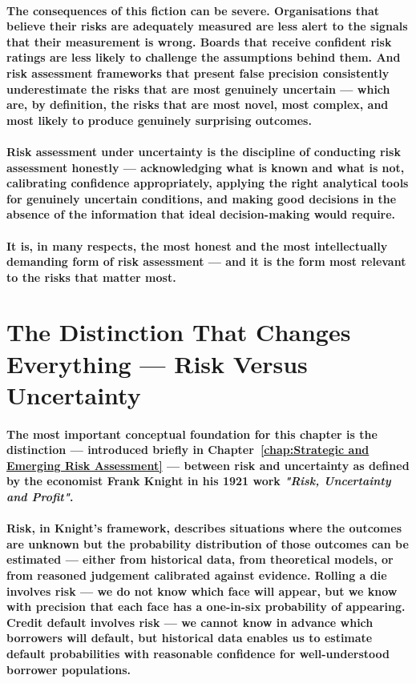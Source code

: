 \paragraph{The consequences of this fiction can be severe. Organisations that believe their risks are adequately measured are less alert to the signals that their measurement is wrong. Boards that receive confident risk ratings are less likely to challenge the assumptions behind them. And risk assessment frameworks that present false precision consistently underestimate the risks that are most genuinely uncertain — which are, by definition, the risks that are most novel, most complex, and most likely to produce genuinely surprising outcomes.}
\paragraph{\textbf{Risk assessment under uncertainty} is the discipline of conducting risk assessment honestly — acknowledging what is known and what is not, calibrating confidence appropriately, applying the right analytical tools for genuinely uncertain conditions, and making good decisions in the absence of the information that ideal decision-making would require.}
\paragraph{It is, in many respects, the most honest and the most intellectually demanding form of risk assessment — and it is the form most relevant to the risks that matter most.}

\section{The Distinction That Changes Everything — Risk Versus Uncertainty}
\paragraph{The most important conceptual foundation for this chapter is the distinction — introduced briefly in Chapter~\ref{chap:Strategic and Emerging Risk Assessment} — between \textbf{risk} and \textbf{uncertainty} as defined by the economist Frank Knight in his 1921 work \textit{"Risk, Uncertainty and Profit"}.}
\paragraph{\textbf{Risk}, in Knight's framework, describes situations where the outcomes are unknown but the probability distribution of those outcomes can be estimated — either from historical data, from theoretical models, or from reasoned judgement calibrated against evidence. Rolling a die involves risk — we do not know which face will appear, but we know with precision that each face has a one-in-six probability of appearing. Credit default involves risk — we cannot know in advance which borrowers will default, but historical data enables us to estimate default probabilities with reasonable confidence for well-understood borrower populations.}
